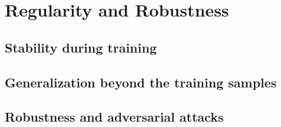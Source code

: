 \section{Regularity and Robustness}
\subsection{Stability during training}

\subsection{Generalization beyond the training samples}

\subsection{Robustness and adversarial attacks}